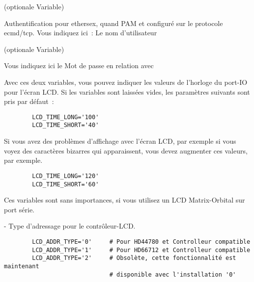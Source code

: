 \begin{description}
 (optionale Variable)

      Authentification pour ethersex, quand PAM et configuré sur le protocole
      ecmd/tcp.
      Vous indiquez ici~: Le nom d'utilisateur

 (optionale Variable)

      Vous indiquez ici le Mot de passe en relation avec 


      Avec ces deux variables, vous pouvez indiquer les valeurs de l'horloge du
      port-IO pour l'écran LCD. Si les variables sont laissées vides, les paramètres
      suivants sont pris par défaut~:

\begin{example}
\begin{verbatim}
        LCD_TIME_LONG='100'
        LCD_TIME_SHORT='40'
\end{verbatim}
\end{example}

      Si vous avez des problèmes d'affichage avec l'écran LCD, par exemple si vous
      voyez des caractères bizarres qui apparaissent, vous devez augmenter ces
      valeurs, par exemple.

\begin{example}
\begin{verbatim}
        LCD_TIME_LONG='120'
        LCD_TIME_SHORT='60'
\end{verbatim}
\end{example}

      Ces variables sont sans importances, si vous utilisez un LCD Matrix-Orbital
      sur port série.

 - Type d'adressage pour le contrôleur-LCD.

\begin{example}
\begin{verbatim}
        LCD_ADDR_TYPE='0'     # Pour HD44780 et Controlleur compatible
        LCD_ADDR_TYPE='1'     # Pour HD66712 et Controlleur compatible
        LCD_ADDR_TYPE='2'     # Obsolète, cette fonctionnalité est maintenant
                              # disponible avec l'installation '0'
\end{verbatim}
\end{example}


\end{description}
